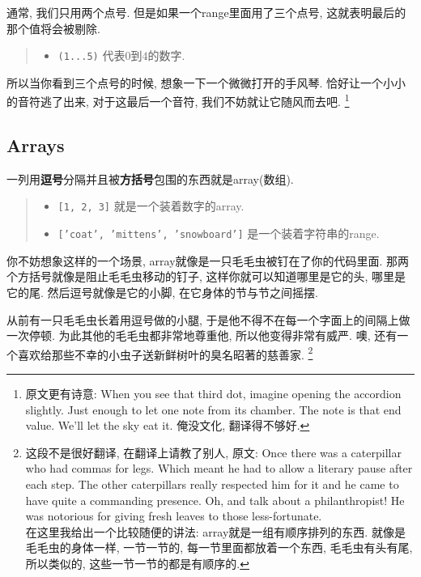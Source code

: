 通常, 我们只用两个点号. 但是如果一个range里面用了三个点号, 
这就表明最后的那个值将会被剔除. 

\begin{quotation}
  \begin{itemize}
    \item \texttt{(1...5)} 代表$0$到$4$的数字. 
  \end{itemize}
\end{quotation}

所以当你看到三个点号的时候, 想象一下一个微微打开的手风琴. 
恰好让一个小小的音符逃了出来, 对于这最后一个音符, 
我们不妨就让它随风而去吧. 
\footnote{原文更有诗意: When you see that third dot, imagine opening the accordion slightly. Just enough to let one note from its chamber. The note is that end value. We'll let the sky eat it. 俺没文化, 翻译得不够好. }

\subsection*{Arrays}
一列用\textbf{逗号}分隔并且被\textbf{方括号}包围的东西就是array(数组).

\begin{quotation}
  \begin{itemize}
    \item \texttt{[1, 2, 3]} 就是一个装着数字的array. 
    \item \texttt{['coat', 'mittens', 'snowboard']} 是一个装着字符串的range. 
  \end{itemize}
\end{quotation}

你不妨想象这样的一个场景, array就像是一只毛毛虫被钉在了你的代码里面. 
那两个方括号就像是阻止毛毛虫移动的钉子, 这样你就可以知道哪里是它的头, 
哪里是它的尾. 然后逗号就像是它的小脚, 在它身体的节与节之间摇摆. 

从前有一只毛毛虫长着用逗号做的小腿, 
于是他不得不在每一个字面上的间隔上做一次停顿. 
为此其他的毛毛虫都非常地尊重他, 所以他变得非常有威严. 
噢, 还有一个喜欢给那些不幸的小虫子送新鲜树叶的臭名昭著的慈善家. 
\footnote{这段不是很好翻译, 在翻译上请教了别人, 原文: Once there was a caterpillar who had commas for legs. Which meant he had to allow a literary pause after each step. The other caterpillars really respected him for it and he came to have quite a commanding presence. Oh, and talk about a philanthropist! He was notorious for giving fresh leaves to those less-fortunate.\\在这里我给出一个比较随便的讲法: array就是一组有顺序排列的东西. 就像是毛毛虫的身体一样, 一节一节的, 每一节里面都放着一个东西, 毛毛虫有头有尾, 所以类似的, 这些一节一节的都是有顺序的. }

